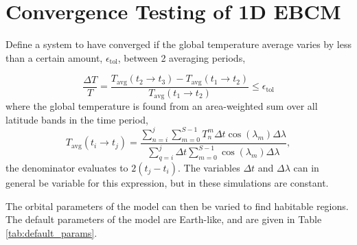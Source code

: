 \documentclass[12pt, onecolumn]{revtex4-2}    %
\begin{document}
\section{Convergence Testing of 1D EBCM} \label{sec:conv_testing}

Define a system to have converged if the global temperature average varies by less than a certain amount, $\epsilon_{\text{tol}}$, between 2 averaging periods,

\begin{equation*}
    \frac{\Delta T}{T} = \frac{T_{\text{avg}}(t_2 \to t_3) - T_{\text{avg}}(t_1 \to t_2)}{T_{\text{avg}}(t_1 \to t_2)}
    \le \epsilon_{\text{tol}}
\end{equation*}
where the global temperature is found from an area-weighted sum over all latitude bands in the time period,
\begin{equation}
    T_{\text{avg}}(t_i \to t_j) = \frac{\sum_{n = i}^{j} \sum_{m = 0}^{S-1} T^m_n \Delta t \cos(\lambda_m)\Delta \lambda}{\sum_{q = i}^{j} \Delta t \sum_{m=0}^{S-1} \cos(\lambda_m)\Delta \lambda},
\end{equation}
the denominator evaluates to $2 (t_j - t_i)$. The variables $\Delta t$ and $\Delta \lambda$ can in general be variable for this expression, but in these simulations are constant.

The orbital parameters of the model can then be varied to find habitable regions. The default parameters of the model are Earth-like, and are given in Table \ref{tab:default_params}.
\end{document}

